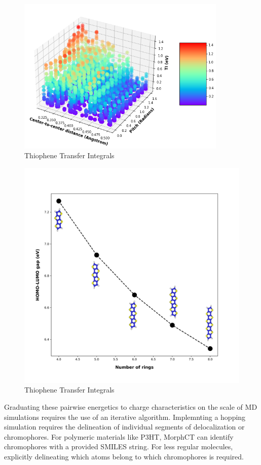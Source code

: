 \begin{figure}
  \center
  \includegraphics[width=10cm]{figures/transfer_integral_plot.png}
  \caption{Thiophene Transfer Integrals}
  \label{fig:TI}
\end{figure}
\begin{figure}
  \center
  \includegraphics[width=15cm]{figures/fused-ring-figure.png}
  \caption{Thiophene Transfer Integrals}
  \label{fig:TI}
\end{figure}


\newline \indent Graduating these pairwise energetics to charge characteristics on the scale of MD simulations
requires the use of an iterative algorithm. Implemnting a hopping simulation requires the delineation of
individual segments of delocalization or chromophores. For polymeric materials like P3HT, MorphCT
can identify chromophores with a provided SMILES string. For less regular molecules, explicitly delineating
which atoms belong to which chromophores is required. 

